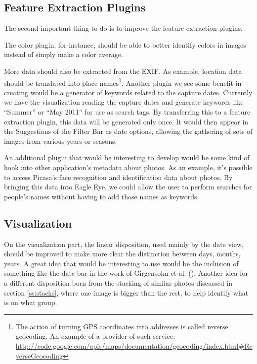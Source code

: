 \subsection{Feature Extraction Plugins} %
\label{sec:feature_extraction}

The second important thing to do is to improve the feature extraction plugins.

The color plugin, for instance, should be able to better identify colors in images instead of simply make a color average.

More data should also be extracted from the EXIF. As example, location data should be translated into place names\footnote{The action of turning GPS coordinates into addresses is called reverse geocoding. An example of a provider of such service: \url{http://code.google.com/apis/maps/documentation/geocoding/index.html\#ReverseGeocoding}}. Another plugin we see some benefit in creating would be a generator of keywords related to the capture dates. Currently we have the visualization reading the capture dates and generate keywords like ``Summer'' or ``May 2011'' for use as search tags. By transferring this to a feature extraction plugin, this data will be generated only once. It would then appear in the Suggestions of the Filter Bar as date options, allowing the gathering of sets of images from various years or seasons.

An additional plugin that would be interesting to develop would be some kind of hook into other application's metadata about photos. As an example, it's possible to access Picasa's face recognition and identification data about photos. By bringing this data into Eagle Eye, we could allow the user to perform searches for people's names without having to add those names as keywords.



\subsection{Visualization} %
\label{sec:visualization}

On the visualization part, the linear disposition, used mainly by the date view, should be improved to make more clear the distinction between days, months, years. A great idea that would be interesting to use would be the inclusion of something like the date bar in the work of Girgensohn et al. \cite{Girgensohn:2010} (). Another idea for a different disposition born from the stacking of similar photos discussed in section \ref{ss:stacks}, where one image is bigger than the rest, to help identify what is on what group.

